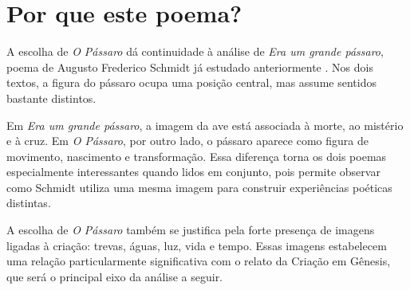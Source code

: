 \section{Por que este poema?}

A escolha de \textit{O Pássaro} dá continuidade à análise de \textit{Era um
grande pássaro}, poema de Augusto Frederico Schmidt já estudado anteriormente
\cite{schmitz2026eraumgrandepassaro}. Nos dois textos, a figura do pássaro
ocupa uma posição central, mas assume sentidos bastante distintos.

Em \textit{Era um grande pássaro}, a imagem da ave está associada à morte, ao
mistério e à cruz. Em \textit{O Pássaro}, por outro lado, o pássaro aparece
como figura de movimento, nascimento e transformação. Essa diferença torna os
dois poemas especialmente interessantes quando lidos em conjunto, pois permite
observar como Schmidt utiliza uma mesma imagem para construir experiências
poéticas distintas.

A escolha de \textit{O Pássaro} também se justifica pela forte presença de
imagens ligadas à criação: trevas, águas, luz, vida e tempo. Essas imagens
estabelecem uma relação particularmente significativa com o relato da Criação
em Gênesis, que será o principal eixo da análise a seguir.
